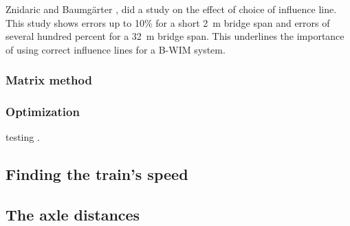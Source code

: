 Znidaric and Baumgärter \cite{bwim_an_overview}, did a study on the effect of choice of influence line. This study shows errors up to 10\% for a short \SI{2}{\metre} bridge span and errors of several hundred percent for a \SI{32}{\metre} bridge span. This underlines the importance of using correct influence lines for a B-WIM system.

\subsubsection{Matrix method}

\subsubsection{Optimization}
testing \cite{Liljencrantz}.

\subsection{Finding the train's speed}

\subsection{The axle distances}
